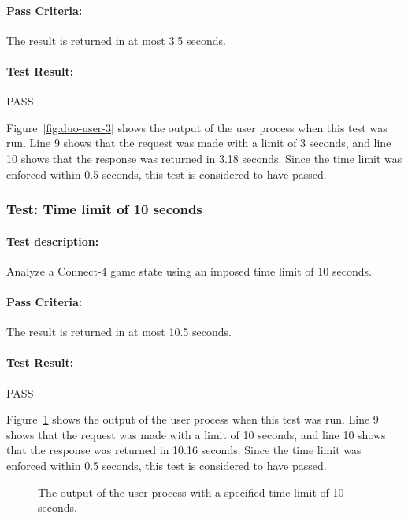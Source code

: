 \documentclass[pdftex,12pt,a4paper]{article}
\begin{document}
\paragraph{Pass Criteria:} The result is returned in at most 3.5 seconds.

\paragraph{Test Result:} PASS

Figure~\ref{fig:duo-user-3} shows the output of the user process when this test was run. Line 9 shows that the request was made with a limit of 3 seconds, and line 10 shows that the response was returned in 3.18 seconds. Since the time limit was enforced within 0.5 seconds, this test is considered to have passed.

\subsubsection{\textbf{Test:} Time limit of 10 seconds}

\paragraph{Test description:} Analyze a Connect-4 game state using an imposed time limit of 10 seconds. 

\paragraph{Pass Criteria:} The result is returned in at most 10.5 seconds.

\paragraph{Test Result:} PASS

Figure~\ref{fig:user-10} shows the output of the user process when this test was run. Line 9 shows that the request was made with a limit of 10 seconds, and line 10 shows that the response was returned in 10.16 seconds. Since the time limit was enforced within 0.5 seconds, this test is considered to have passed.

\begin{figure}[h]

\caption{The output of the user process with a specified time limit of 10 seconds.}
\label{fig:user-10}
\end{figure}
\end{document}

